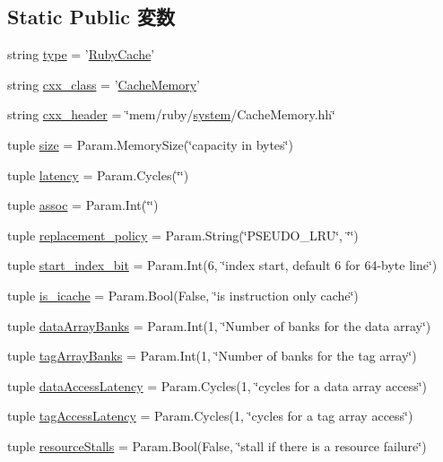 \subsection*{Static Public 変数}
\begin{DoxyCompactItemize}
\item 
string \hyperlink{classCache_1_1RubyCache_acce15679d830831b0bbe8ebc2a60b2ca}{type} = '\hyperlink{classCache_1_1RubyCache}{RubyCache}'
\item 
string \hyperlink{classCache_1_1RubyCache_a58cd55cd4023648e138237cfc0822ae3}{cxx\_\-class} = '\hyperlink{classCacheMemory}{CacheMemory}'
\item 
string \hyperlink{classCache_1_1RubyCache_a17da7064bc5c518791f0c891eff05fda}{cxx\_\-header} = \char`\"{}mem/ruby/\hyperlink{classBaseCache_af27ccd765f13a4b7bd119dc7579e2746}{system}/CacheMemory.hh\char`\"{}
\item 
tuple \hyperlink{classCache_1_1RubyCache_a377e5da8df1f89c5468c8b8cd07eac89}{size} = Param.MemorySize(\char`\"{}capacity in bytes\char`\"{})
\item 
tuple \hyperlink{classCache_1_1RubyCache_ab6371bb71615c96debd0d27d34943fed}{latency} = Param.Cycles(\char`\"{}\char`\"{})
\item 
tuple \hyperlink{classCache_1_1RubyCache_a19c16ab1fbe2e2d958dbfd7213149cfc}{assoc} = Param.Int(\char`\"{}\char`\"{})
\item 
tuple \hyperlink{classCache_1_1RubyCache_abe3a9f09e93027c7a960442bd92af2da}{replacement\_\-policy} = Param.String(\char`\"{}PSEUDO\_\-LRU\char`\"{}, \char`\"{}\char`\"{})
\item 
tuple \hyperlink{classCache_1_1RubyCache_a9b48e581ffca2622c826582a361b4bf1}{start\_\-index\_\-bit} = Param.Int(6, \char`\"{}index start, default 6 for 64-\/byte line\char`\"{})
\item 
tuple \hyperlink{classCache_1_1RubyCache_aecbc924fc0d093572da628a0803f0d4f}{is\_\-icache} = Param.Bool(False, \char`\"{}is instruction only cache\char`\"{})
\item 
tuple \hyperlink{classCache_1_1RubyCache_a881257012121ba173fad314a15c90cfd}{dataArrayBanks} = Param.Int(1, \char`\"{}Number of banks for the data array\char`\"{})
\item 
tuple \hyperlink{classCache_1_1RubyCache_a794d6c9ff250b147df46c725201c4bbd}{tagArrayBanks} = Param.Int(1, \char`\"{}Number of banks for the tag array\char`\"{})
\item 
tuple \hyperlink{classCache_1_1RubyCache_aff29edacbeb0dfe8d5191cbde1450be2}{dataAccessLatency} = Param.Cycles(1, \char`\"{}cycles for a data array access\char`\"{})
\item 
tuple \hyperlink{classCache_1_1RubyCache_a6326c35602f2f8cea6b953033f57f4f6}{tagAccessLatency} = Param.Cycles(1, \char`\"{}cycles for a tag array access\char`\"{})
\item 
tuple \hyperlink{classCache_1_1RubyCache_ab2a0030d9d6b879176bc79b5557e75d5}{resourceStalls} = Param.Bool(False, \char`\"{}stall if there is a resource failure\char`\"{})
\end{DoxyCompactItemize}
